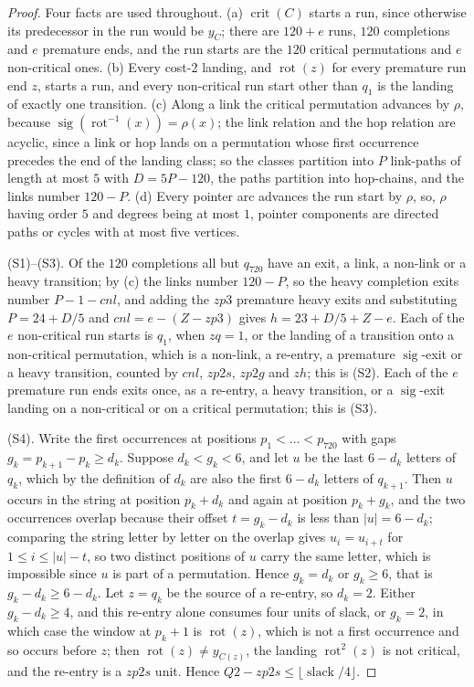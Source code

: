 \documentclass[10pt]{article}
\theoremstyle{remark}
\theoremstyle{plain}
\newcommand{\crit}{\operatorname{crit}}
\newcommand{\rot}{\operatorname{rot}}
\newcommand{\sig}{\operatorname{sig}}
\newcommand{\slack}{\operatorname{slack}}
\begin{document}
\begin{proof}
Four facts are used throughout.  (a) $\crit(C)$ starts a run, since
otherwise its predecessor in the run would be $y_C$; there are $120+e$
runs, $120$ completions and $e$ premature ends, and the run starts are
the $120$ critical permutations and $e$ non-critical ones.
(b) Every cost-2 landing, and $\rot(z)$ for every premature run end
$z$, starts a run, and every non-critical run start other than $q_1$
is the landing of exactly one transition.  (c) Along a link the
critical permutation advances by $\rho$, because
$\sig(\rot^{-1}(x))=\rho(x)$; the link relation and the hop relation
are acyclic, since a link or hop lands on a permutation whose first
occurrence precedes the end of the landing class; so the classes
partition into $P$ link-paths of length at most $5$ with $D=5P-120$,
the paths partition into hop-chains, and the links number $120-P$.
(d) Every pointer arc advances the run start by $\rho$, so, $\rho$
having order $5$ and degrees being at most $1$, pointer components are
directed paths or cycles with at most five vertices.

(S1)--(S3).  Of the $120$ completions all but $q_{720}$ have an exit,
a link, a non-link or a heavy transition; by (c) the links number
$120-P$, so the heavy completion exits number $P-1-\mathit{cnl}$, and
adding the $zp3$ premature heavy exits and substituting $P=24+D/5$ and
$\mathit{cnl}=e-(Z-zp3)$ gives $h=23+D/5+Z-e$.  Each of the $e$ non-critical run starts is $q_1$,
when $zq=1$, or the landing of a transition onto a non-critical
permutation, which is a non-link, a re-entry, a premature $\sig$-exit
or a heavy transition, counted by $\mathit{cnl}$, $zp2s$, $zp2g$ and
$zh$; this is (S2).  Each of the $e$ premature run ends exits once, as
a re-entry, a heavy transition, or a $\sig$-exit landing on a
non-critical or on a critical permutation; this is (S3).

(S4).  Write the first occurrences at positions $p_1<\dots<p_{720}$
with gaps $g_k=p_{k+1}-p_k\ge d_k$.  Suppose $d_k<g_k<6$, and let $u$
be the last $6-d_k$ letters of $q_k$, which by the definition of $d_k$
are also the first $6-d_k$ letters of $q_{k+1}$.  Then $u$ occurs in
the string at position $p_k+d_k$ and again at position $p_k+g_k$, and
the two occurrences overlap because their offset $t=g_k-d_k$ is less
than $|u|=6-d_k$; comparing the string letter by letter on the overlap
gives $u_i=u_{i+t}$ for $1\le i\le |u|-t$, so two distinct positions of
$u$ carry the same letter, which is impossible since $u$ is part of a
permutation.  Hence $g_k=d_k$ or $g_k\ge 6$, that is $g_k-d_k\ge
6-d_k$.  Let $z=q_k$ be the source of a re-entry, so
$d_k=2$.  Either $g_k-d_k\ge 4$, and this re-entry alone consumes four
units of slack, or $g_k=2$, in which case the window at $p_k+1$ is
$\rot(z)$, which is not a first occurrence and so occurs before $z$;
then $\rot(z)\ne y_{C(z)}$, the landing $\rot^2(z)$ is not critical,
and the re-entry is a $zp2s$ unit.  Hence
$Q2-zp2s\le\lfloor\slack/4\rfloor$.


\end{proof}
\end{document}
